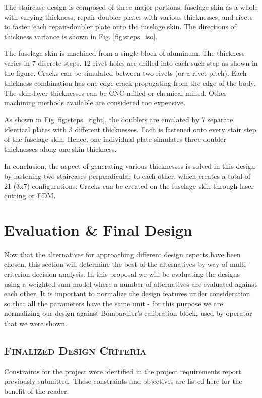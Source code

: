 \documentclass[12pt]{article}
\begin{document}
The staircase design is composed of three major portions;  fuselage skin as a whole with varying thickness,  repair-doubler plates with various thicknesses, and rivets to fasten each repair-doubler plate onto the fuselage skin. The directions of thickness variance is shown in Fig. \ref{fig:steps_iso}.

The fuselage skin is machined from a single block of aluminum. The thickness varies in 7 discrete steps. 12 rivet holes are drilled into each such step as shown in the figure. Cracks can be simulated between two rivets (or a rivet pitch). Each thickness combination has one edge crack propagating from the edge of the body. The skin layer thicknesses can be CNC milled or chemical milled. Other machining methods available are considered too expensive.

As shown in Fig.\ref{fig:steps_right}, the doublers are emulated by 7 separate identical plates with 3 different thicknesses. Each is fastened onto every stair step of the fuselage skin. Hence, one individual plate simulates three doubler thicknesses along one skin thickness.

In conclusion, the aspect of generating various thicknesses is solved in this design by fastening two staircases perpendicular to each other, which creates a total of 21 (3x7) configurations. Cracks can be created on the fuselage skin through laser cutting or EDM.
\newpage

\section{Evaluation \& Final Design}
Now that the alternatives for approaching different design aspects have been chosen, this section will determine the best of the alternatives by way of multi-criterion decision analysis. In this proposal we will be evaluating the designs using a weighted sum model where a number of alternatives are evaluated against each other. It is important to normalize the design features under consideration so that all the parameters have the same unit - for this purpose we are normalizing our design against Bombardier's calibration block, used by operator that we were shown. 

\subsection{\textsc{Finalized Design Criteria}}

Constraints for the project were identified in the project requirements report previously submitted. These constraints and objectives are listed here for the benefit of the reader.
\end{document}
